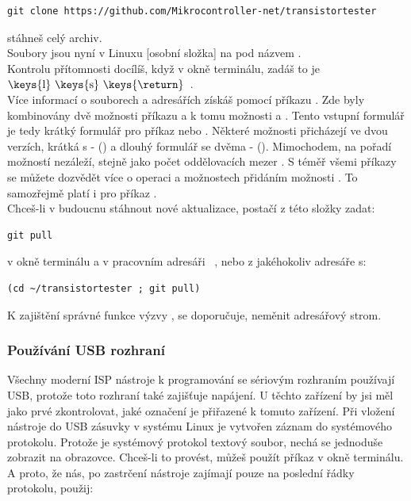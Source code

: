 \begin{large} \vspace{-0.4em} \begin{verbatim}
git clone https://github.com/Mikrocontroller-net/transistortester
\end{verbatim} \end{large}
stáhneš celý archiv. \\
Soubory jsou nyní v Linuxu [osobní složka] na  pod názvem .\\
Kontrolu přítomnosti docílíš, když v okně terminálu, zadáš  to je \(\mbox{\keys{l} \keys{s} \keys{\return}}\)~.\\
Více informací o souborech a adresářích získáš pomocí
příkazu . Zde byly kombinovány dvě možnosti příkazu 
a k tomu možnosti  a . Tento vstupní formulář je tedy krátký formulář pro
příkaz  nebo .
Některé možnosti přicházejí ve dvou verzích, krátká s - ()
a dlouhý formulář se dvěma - ().
Mimochodem, na pořadí možností nezáleží,
stejně jako počet oddělovacích mezer \keys{\space}.
S téměř všemi příkazy se můžete dozvědět více o operaci a možnostech
přidáním možnosti .
To samozřejmě platí i pro příkaz . \\ 
Chceš-li v budoucnu stáhnout nové aktualizace, postačí z této složky zadat:
\begin{large} \vspace{-0.4em} \begin{verbatim}
git pull
\end{verbatim} \end{large}
v okně terminálu a v pracovním adresáři ~,
nebo z jakéhokoliv adresáře s:

\begin{large} \vspace{-0.4em} \begin{verbatim}
(cd ~/transistortester ; git pull)
\end{verbatim} \end{large}

K zajištění správné funkce výzvy  , se doporučuje, neměnit adresářový strom. 

\subsubsection{Používání USB rozhraní}
Všechny moderní ISP nástroje k programování se sériovým rozhraním používají USB,
protože toto rozhraní také zajišťuje napájení.
U těchto zařízení by jsi měl jako prvé zkontrolovat, jaké označení je přiřazené k tomuto zařízení.
Při vložení nástroje do USB zásuvky v systému Linux je vytvořen záznam do systémového protokolu.
Protože je systémový protokol textový soubor, nechá se jednoduše zobrazit na obrazovce.
Chceš-li to provést, můžeš použít příkaz  v okně terminálu.
A proto, že nás, po zastrčení nástroje zajímají pouze na poslední řádky protokolu, použij:

